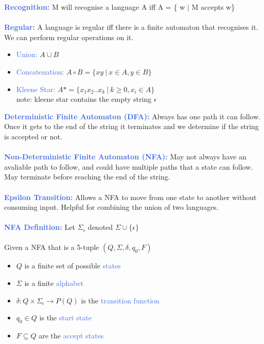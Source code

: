 \documentclass[a4paper,10pt]{article}
\begin{document}
\textcolor{RoyalBlue}{\textbf{Recognition:}} M will recognise a language A iff A = \{ w $|$ M accepts w\} \\\\
\textcolor{RoyalBlue}{\textbf{Regular:}} A language is regular iff there is a finite automaton that recognises it. We can perform regular operations on it. 
\renewcommand{\labelitemi}{\textperiodcentered}
\begin{itemize}
\item \textcolor{RoyalBlue}{Union:} $A \cup B$
\item \textcolor{RoyalBlue}{Concatenation:} $A \circ B = \{xy \ | \ x \in A, y \in B \}$
\item \textcolor{RoyalBlue}{Kleene Star:} $A* = \{ x_{1}x_{2}..x_{k} \ | \ k \geq 0, x_{i} \in A \}$ \\
note: kleene star contains the empty string $\epsilon$ \\
\end{itemize}
\textcolor{RoyalBlue}{\textbf{Deterministic Finite Automaton (DFA):}} Always has one path it can follow. Once it gets to the end of the string it terminates and we determine if the string is accepted or not. \\\\
\textcolor{RoyalBlue}{\textbf{Non-Deterministic Finite Automaton (NFA):}} May not always have an avaliable path to follow, and could have multiple paths that a state can follow. May terminate before reaching the end of the string.  \\\\
\textcolor{RoyalBlue}{\textbf{Epsilon Transition:}} Allows a NFA to move from one state to another without consuming input. Helpful for combining the union of two languages. \\\\
\newpage
\noindent \textcolor{RoyalBlue}{\textbf{NFA Definition:}} Let $\Sigma_{\epsilon}$ denoted $\Sigma \cup \{\epsilon\}$ \\ \\
Given a NFA that is a 5-tuple $(Q, \Sigma, \delta, q_{0}, F)$
\renewcommand{\labelitemi}{\textperiodcentered}
\begin{itemize}
\item $Q$ is a finite set of possible \textcolor{RoyalBlue}{states} 
\item $\Sigma$ is a finite \textcolor{RoyalBlue}{alphabet}
\item $\delta: Q \times \Sigma_{\epsilon} \rightarrow P(Q)$ is the \textcolor{RoyalBlue}{transition function} 
\item $q_{0} \in Q$ is the \textcolor{RoyalBlue}{start state}
\item $F \subseteq Q$ are the \textcolor{RoyalBlue}{accept states}\\
\end{itemize}
\end{document}
